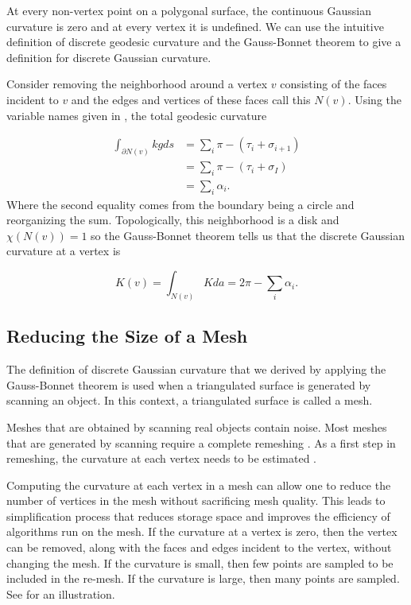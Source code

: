 At every non-vertex point on a polygonal surface, the continuous Gaussian curvature
is zero and at every vertex it is undefined.
We can use the intuitive definition of discrete geodesic curvature and the Gauss-Bonnet
theorem to give a definition for discrete Gaussian curvature.

Consider removing the neighborhood around a vertex $v$ consisting
of the faces incident to $v$ and the edges and vertices of these faces call
this $N(v)$.
Using the variable names given in ,
the total geodesic curvature

\begin{align}
\int_{\partial N(v)} kg ds &=\sum_i \pi -(\tau_i+\sigma_{i+1})\nonumber  \\
       &=\sum_i \pi -(\tau_i+\sigma_{I}) \nonumber  \\
       &=\sum_i \alpha_i. \nonumber 
\end{align}
Where the second equality comes from the boundary being a circle and reorganizing the sum.
Topologically, this neighborhood is a disk and $\chi(N(v))=1$
so the Gauss-Bonnet theorem tells us that 
the discrete Gaussian curvature at a vertex is
\begin{definition}\label{def:discrete-curvature-vertex}

$$K(v)=\int_{N(v)}K da=2\pi-\sum_i \alpha_i.$$

\end{definition}

\subsection{Reducing the Size of a Mesh}
\label{sec:removing}

The definition of discrete Gaussian curvature that we
derived by applying the Gauss-Bonnet theorem is used when 
a triangulated surface is generated by scanning an object.
In this context, a triangulated surface is called a mesh.

Meshes that are obtained by scanning real objects contain noise.
Most meshes that are generated by scanning require a complete
remeshing \cite{remeshing-2003}.
As a first step in remeshing, the curvature at each
vertex needs to be estimated \cite{mmsb-2003}.




Computing the curvature at each vertex in a mesh can allow one to reduce
the number of vertices in the mesh without sacrificing mesh quality.
This leads to simplification process that reduces storage space and improves the efficiency of
 algorithms run on the mesh.
If the curvature at a vertex is zero, then the vertex can be removed,
along with the faces and edges incident to the vertex, without changing 
the mesh.
 If the curvature is small, then few points
are sampled to be included in the re-mesh. If the curvature
is large, then many points are sampled. See 
for an illustration.

